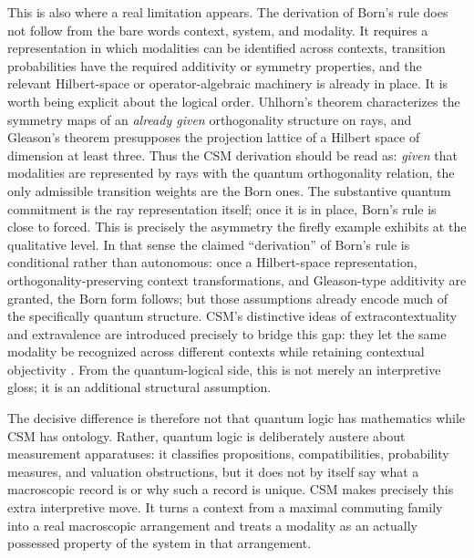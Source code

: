 \documentclass[
aps,
pra,
reprint,
superscriptaddress,
nofootinbib,
longbibliography
]{revtex4-2}
\begin{document}
This is also where a real limitation appears.  The derivation of Born's rule
does not follow from the bare words context, system, and modality.  It
requires a representation in which modalities can be identified across
contexts, transition probabilities have the required additivity or symmetry
properties, and the relevant Hilbert-space or operator-algebraic machinery is
already in place.  It is worth being explicit about the logical order.
Uhlhorn's theorem characterizes the symmetry maps of an \emph{already given}
orthogonality structure on rays, and Gleason's theorem presupposes the
projection lattice of a Hilbert space of dimension at least three.  Thus the
CSM derivation should be read as: \emph{given} that modalities are represented
by rays with the quantum orthogonality relation, the only admissible transition
weights are the Born ones.  The substantive quantum commitment is the ray
representation itself; once it is in place, Born's rule is close to forced.
This is precisely the asymmetry the firefly example exhibits at the qualitative
level.  In that sense the claimed ``derivation'' of Born's rule is conditional
rather than autonomous: once a Hilbert-space representation,
orthogonality-preserving context transformations, and Gleason-type additivity
are granted, the Born form follows; but those assumptions already encode much
of the specifically quantum structure.  CSM's distinctive ideas of
extracontextuality and extravalence are introduced precisely to bridge this
gap: they let the same modality be recognized across different contexts while
retaining contextual objectivity
\cite{auffeves2016,grangier2022,vandenbossche2023}.  From the
quantum-logical side, this is not merely an interpretive gloss; it is an
additional structural assumption.

The decisive difference is therefore not that quantum logic has mathematics
while CSM has ontology.  Rather, quantum logic is deliberately austere about
measurement apparatuses: it classifies propositions, compatibilities,
probability measures, and valuation obstructions, but it does not by itself
say what a macroscopic record is or why such a record is unique.  CSM makes
precisely this extra interpretive move.  It turns a context from a maximal
commuting family into a real macroscopic arrangement and treats a modality as
an actually possessed property of the system in that arrangement.
\end{document}
